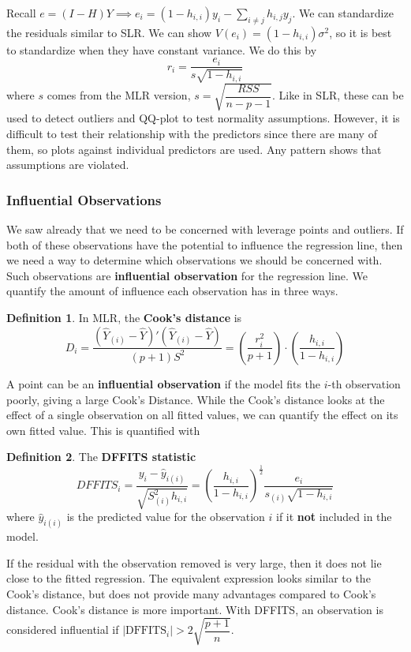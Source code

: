 \documentclass[12pt, a4paper]{article}
\theoremstyle{definition}
\newtheorem{definition}{Definition}
\newcommand{\imp}{\implies}
\newcommand{\f}{\frac}
\newcommand{\df}{\dfrac}
\newcommand{\abs}[1]{\left| #1 \right|}
\newcommand{\BB}[1]{\left(#1\right)}
\begin{document}
  	Recall $e = (I-H)Y \imp e_i = (1-h_{i,i}) y_i - \sum_{i\neq j} h_{i,j} y_j$. We can standardize the residuals similar to SLR. We can show $V(e_i) = (1-h_{i,i}) \sigma^2$, so it is best to standardize when they have constant variance. We do this by
  	$$
  		r_i = \f{e_i}{s\sqrt{1- h_{i,i} }}
  	$$ 
  	where $s$ comes from the MLR version, $s = \sqrt{\df{RSS}{n-p-1}}$.
  	Like in SLR, these can be used to detect outliers and QQ-plot to test normality assumptions. However, it is difficult to test their relationship with the predictors since there are many of them, so plots against individual predictors are used. Any pattern shows that assumptions are violated.
  	
  	\subsubsection{Influential Observations}
  	
  	We saw already that we need to be concerned with leverage points and outliers. If both of these observations have the potential to influence the regression line, then we need a way to determine which observations we should be concerned with. Such observations are {\bf influential observation} for the regression line. We quantify the amount of influence each observation has in three ways.
  	
  	\begin{definition}
  		In MLR, the {\bf Cook's distance} is
  		$$
  			D_i = \f{(\hat Y_{(i)} - \hat Y )'(\hat Y_{(i)} - \hat Y )}{(p+1)S^2} = \BB{\f{r_i^2}{p+1}} \cdot \BB{
  					\f{h_{i,i}}{1-h_{i,i}}}
  		$$
  	\end{definition}
  	A point can be an {\bf influential observation} if the model fits the $i$-th observation poorly, giving a large Cook's Distance. While the Cook's distance looks at the effect of a single observation on all fitted values, we can quantify the effect on its own fitted value. This is quantified with 
  	\begin{definition}
  		The {\bf DFFITS statistic} 
  		$$
  			DFFITS_i = \f{y_i - \hat y_{i(i)}}{\sqrt{S^2_{(i)} h_{i,i}}}
  				= \BB{\f{h_{i,i}}{1-h_{i,i}}}^{\f12}\f{e_i}{s_{(i)} \sqrt{1-h_{i,i}}}
  		$$
  		where $\hat y_{i(i)}$ is the predicted value for the observation $i$ if it {\bf not} included in the model.
  	\end{definition}
  	If the residual with the observation removed is very large, then it does not lie close to the fitted regression. The equivalent expression looks similar to the Cook's distance, but does not provide many advantages compared to Cook's distance. Cook's distance is more important. With DFFITS, an observation is considered influential if $\abs{\text{DFFITS}_i} > 2 \sqrt{\df{p+1}{n}}$.\\
  	
\end{document}
